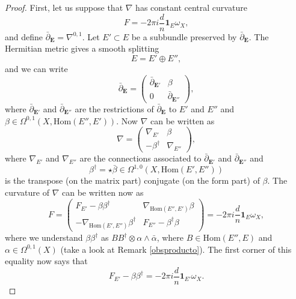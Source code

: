 \documentclass[12pt,a4paper]{book}
\theoremstyle{definition} \newtheorem{defn}[thm]{Definition}
\theoremstyle{definition} \newtheorem{ejemplo}[thm]{Example}
\theoremstyle{remark} \newtheorem{rem}[thm]{Remark}
\def\id{\mathbf{1}}
\def\Hom{\mathrm{Hom}}
\def\delbar{\bar{\partial}}
\newcommand{\ve}[1]{\mathbf{#1}}
\begin{document}
\begin{proof}
First, let us suppose that $\nabla$ has constant central curvature
\begin{equation*}
  F=-2\pi i \frac{d}{n} \id_E \omega_X,
\end{equation*}
and define $\delbar_{\ve{E}}=\nabla^{0,1}$. Let $E'\subset E$ be a subbundle preserved by $\delbar_{\ve{E}}$. The Hermitian metric gives a smooth splitting
\begin{equation*}
  E=E'\oplus E'',
\end{equation*}
and we can write
\begin{equation*}
  \delbar_{\ve{E}}=\left(
  \begin{array}{cc}
    \delbar_{\ve{E}'} & \beta \\
    0 & \delbar_{\ve{E}''}
  \end{array}\right),
\end{equation*}
where $\delbar_{\ve{E}'}$ and $\delbar_{\ve{E}''}$ are the restrictions of $\delbar_{\ve{E}}$ to $E'$ and $E''$ and $\beta \in \Omega^{0,1}(X,\Hom (E'',E'))$. Now $\nabla$ can be written as
\begin{equation*}
  \nabla=\left(
  \begin{array}{cc}
    \nabla_{E'} & \beta \\
    -\beta^\dagger & \nabla_{E''}
  \end{array}\right),
\end{equation*}
where $\nabla_{E'}$ and $\nabla_{E''}$ are the connections associated to $\delbar_{\ve{E}'}$ and $\delbar_{\ve{E}''}$ and $$\beta^\dagger=\star \bar{\beta} \in \Omega^{1,0}(X,\Hom(E',E''))$$ is the transpose (on the matrix part) conjugate (on the form part) of $\beta$. The curvature of $\nabla$ can be written now as
\begin{equation*}
  F=\left(
  \begin{array}{cc}
    F_{E'}-\beta \beta^\dagger & \nabla_{\Hom(E'',E')}\beta \\
    -\nabla_{\Hom (E',E'')}\beta^\dagger & F_{E''}-\beta^\dagger  \beta
  \end{array}\right)=-2\pi i\frac{d}{n} \id_E \omega_X,
\end{equation*}
where we understand $\beta \beta^\dagger$ as $BB^\dagger \otimes \alpha \wedge \bar{\alpha}$, where $B \in \Hom(E'',E)$ and $\alpha \in \Omega^{0,1}(X)$ (take a look at Remark \ref{obsproducto}).
The first corner of this equality now says that
\begin{equation*}
  F_{E'}-\beta\beta^\dagger = -2\pi i \frac{d}{n} \id_{E'} \omega_X.

\end{equation*}
\end{proof}
\end{document}
